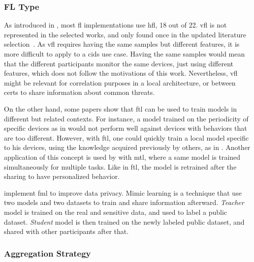 \subsubsection{FL Type\label{sec:sota.quali.type}}

As introduced in , most \gls{fl} implementations use \gls{hfl}, 18 out of 22.
\Gls{vfl} is not represented in the selected works, and only found once in the updated literature selection~\cite{novikova_FederatedLearningIntrusion_2022}.
As \gls{vfl} requires having the same samples but different features, it is more difficult to apply to a \gls{cids} use case.
Having the same samples would mean that the different participants monitor the same devices, just using different features, which does not follow the motivations of this work.
Nevertheless, \gls{vfl} might be relevant for correlation purposes in a local architecture, or between \glspl{cert} to share information about common threats.

On the other hand, some papers show that \gls{ftl} can be used to train models in different but related contexts.
For instance, a model trained on the periodicity of specific devices as in \cite{pahl_AllEyesYou_2018,nguyen_DIoTFederatedSelflearning_2019} would not perform well against devices with behaviors that are too different.
However, with \gls{ftl}, one could quickly train a local model specific to his devices, using the knowledge acquired previously by others, as in \cite{fan_IoTDefenderFederatedTransfer_2020}.
Another application of this concept is used by \cite{zhao_MultiTaskNetworkAnomaly_2019} with \gls{mtl}, where a same model is trained simultaneously for multiple tasks.
Like in \gls{ftl}, the model is retrained after the sharing to have personalized behavior.

\textcite{al-athbaal-marri_FederatedMimicLearning_2020} implement \gls{fml} to improve data privacy.
Mimic learning is a technique that use two models and two datasets to train and share information afterward.
\emph{Teacher} model is trained on the real and sensitive data, and used to label a public dataset.
\emph{Student} model is then trained on the newly labeled public dataset, and shared with other participants after that.


\subsubsection{Aggregation Strategy\label{sec:sota.quali.agg}}

